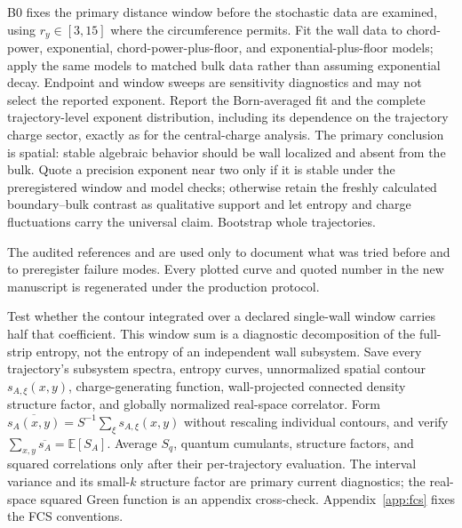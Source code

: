 \documentclass[aps,prx,onecolumn,nofootinbib,superscriptaddress,longbibliography]{revtex4-2}
\newcommand{\E}{\mathbb{E}}
\begin{document}
B0 fixes the primary distance window before the stochastic data are examined, using
$r_y\in[3,15]$ where the circumference permits.  Fit the wall data to chord-power,
exponential, chord-power-plus-floor, and exponential-plus-floor models; apply the same
models to matched bulk data rather than assuming exponential decay.  Endpoint and window
sweeps are sensitivity diagnostics and may not select the reported exponent.  Report the
Born-averaged fit and the complete trajectory-level exponent distribution, including its
dependence on the trajectory charge sector, exactly as for the central-charge analysis.
The primary conclusion is spatial: stable algebraic behavior should be wall localized and
absent from the bulk.  Quote a precision exponent near two only if it is stable under the
preregistered window and model checks; otherwise retain the freshly calculated
boundary--bulk contrast as qualitative support and let entropy and charge fluctuations
carry the universal claim.  Bootstrap whole trajectories.

The audited references
 and
 are used
only to document what was tried before and to preregister failure modes.  Every plotted
curve and quoted number in the new manuscript is regenerated under the production
protocol.

Test whether the contour integrated over a declared single-wall window carries half
that coefficient.  This window sum is a diagnostic decomposition of the full-strip
entropy, not the entropy of an independent wall subsystem.  Save every trajectory's
subsystem spectra, entropy curves, unnormalized spatial contour
$s_{A,\xi}(x,y)$, charge-generating function, wall-projected connected density structure
factor, and globally normalized real-space correlator.  Form
$\overline{s_A(x,y)}=S^{-1}\sum_\xi s_{A,\xi}(x,y)$ without rescaling individual
contours, and verify $\sum_{x,y}\overline{s_A}=\E[S_A]$.  Average $S_q$, quantum
cumulants, structure factors, and squared correlations only after their per-trajectory
evaluation.  The interval variance and its small-$k$ structure factor are primary current
diagnostics; the real-space squared Green function is an appendix cross-check.
Appendix~\ref{app:fcs} fixes the FCS conventions.
\end{document}
